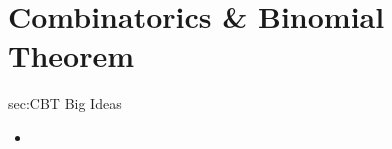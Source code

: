 \chapter{Combinatorics \& Binomial Theorem}
\label{chap:CBT}

\begin{bigideas}{sec:CBT Big Ideas}
\begin{itemize}
  \item   
\end{itemize}
\end{bigideas}